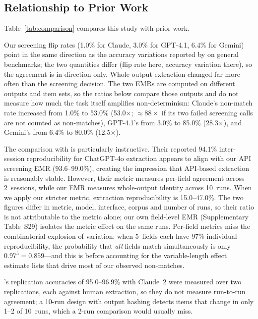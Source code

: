 \documentclass[preprint,review,12pt,authoryear]{elsarticle}
\begin{document}
\subsection{Relationship to Prior Work}

Table~\ref{tab:comparison} compares this study with prior work.

Our screening flip rates (1.0\% for Claude, 3.0\% for GPT-4.1, 6.4\% for Gemini) point in the same direction as the accuracy variations reported by \citet{atil2024nondeterminism} on general benchmarks; the two quantities differ (flip rate here, accuracy variation there), so the agreement is in direction only.
Whole-output extraction changed far more often than the screening decision. The two EMRs are computed on different outputs and item sets, so the ratios below compare those outputs and do not measure how much the task itself amplifies non-determinism: Claude's non-match rate increased from 1.0\% to 53.0\% (53.0$\times$; ${\approx}88\times$ if its two failed screening calls are not counted as non-matches), GPT-4.1's from 3.0\% to 85.0\% (28.3$\times$), and Gemini's from 6.4\% to 80.0\% (12.5$\times$).

The comparison with \citet{jensen2025chatgpt} is particularly instructive.
Their reported 94.1\% inter-session reproducibility for ChatGPT-4o extraction appears to align with our API screening EMR (93.6--99.0\%), creating the impression that API-based extraction is reasonably stable.
However, their metric measures per-field agreement across 2~sessions, while our EMR measures whole-output identity across 10~runs.
When we apply our stricter metric, extraction reproducibility is 15.0--47.0\%. The two figures differ in metric, model, interface, corpus and number of runs, so their ratio is not attributable to the metric alone; our own field-level EMR (Supplementary Table~S29) isolates the metric effect on the same runs.
Per-field metrics miss the combinatorial explosion of variation: when 5~fields each have 97\% individual reproducibility, the probability that \emph{all} fields match simultaneously is only $0.97^5 = 0.859$---and this is before accounting for the variable-length effect estimate lists that drive most of our observed non-matches.

\citeauthor{gartlehner2024extraction}'s \citeyearpar{gartlehner2024extraction} replication accuracies of 95.0--96.9\% with Claude~2 were measured over two replications, each against human extraction, so they do not measure run-to-run agreement; a 10-run design with output hashing detects items that change in only 1--2 of 10~runs, which a 2-run comparison would usually miss.
\end{document}

